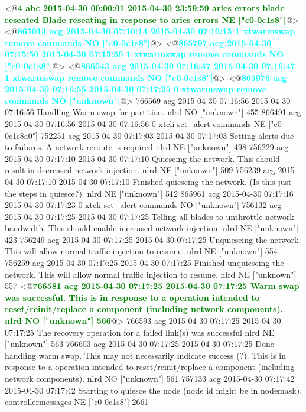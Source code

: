 \begin{figure*}
\begin{annol}
<@\textbf{\textcolor{green}{4	abc	2015-04-30 00:00:01	2015-04-30 23:59:59	aries errors	blade reseated	Blade reseating in response to aries errors	NE	["c0-0c1s8"]}}@>
<@\textbf{\textcolor{cyan}{865013	acg	2015-04-30 07:10:14	2015-04-30 07:10:15	1	xtwarmswap remove	commands	NO	["c0-0c1s8"]}}@>
<@\textbf{\textcolor{cyan}{865797	acg	2015-04-30 07:15:50	2015-04-30 07:15:50	1	xtwarmswap remove	commands	NO	["c0-0c1s8"]}}@>
<@\textbf{\textcolor{cyan}{866043	acg	2015-04-30 07:16:47	2015-04-30 07:16:47	1	xtwarmswap remove	commands	NO	["c0-0c1s8"]}}@>
<@\textbf{\textcolor{cyan}{865976	acg	2015-04-30 07:16:55	2015-04-30 07:17:25	0	xtwarmswap remove	commands	NO	["unknown"]}}@>
766569	acg	2015-04-30 07:16:56	2015-04-30 07:16:56		Handling Warm swap for partition.	nlrd	NO	["unknown"]	455
866491	acg	2015-04-30 07:16:56	2015-04-30 07:16:56	0	xtcli set_alert		commands	NE	["c0-0c1s8a0"]
752251	acg	2015-04-30 07:17:03	2015-04-30 07:17:03		Setting alerts due to failures. A network reroute is required	nlrd	NE	["unknown"]	498
756229	acg	2015-04-30 07:17:10	2015-04-30 07:17:10		Quiescing the network. This should result in decreased network injection.	nlrd	NE	["unknown"]	509
756239	acg	2015-04-30 07:17:10	2015-04-30 07:17:10		Finished quiescing the network. (Is this just the steps in quiesce?).	nlrd	NE	["unknown"]	512
865961	acg	2015-04-30 07:17:16	2015-04-30 07:17:23	0	xtcli set_alert		commands	NO	["unknown"]
756132	acg	2015-04-30 07:17:25	2015-04-30 07:17:25		Telling all blades to unthrottle network bandwidth. This should enable increased network injection.	nlrd	NE	["unknown"]	423
756249	acg	2015-04-30 07:17:25	2015-04-30 07:17:25		Unquiescing the network. This will allow normal traffic injection to resume.	nlrd	NE	["unknown"]	554
756259	acg	2015-04-30 07:17:25	2015-04-30 07:17:25		Finished unquiescing the network. This will allow normal traffic injection to resume.	nlrd	NE	["unknown"]	557
<@\textbf{\textcolor{green}{766581	acg	2015-04-30 07:17:25	2015-04-30 07:17:25		Warm swap was successful. This is in response to a operation intended to reset/reinit/replace a component (including network components).	nlrd	NO	["unknown"]	566}}@>
766593	acg	2015-04-30 07:17:25	2015-04-30 07:17:25		The recovery operation for a failed link(s) was successful	nlrd	NE	["unknown"]	563
766603	acg	2015-04-30 07:17:25	2015-04-30 07:17:25		Done handling warm swap. This may not necessarily indicate success (?). This is in response to a operation intended to reset/reinit/replace a component (including network components).		nlrd	NO	["unknown"]	561
757133	acg	2015-04-30 07:17:42	2015-04-30 07:17:42		Starting to quiesce the node (node id might be in nodemask).		controllermessages	NE	["c0-0c1s8"]	2661

\end{annol}
\end{figure*}
